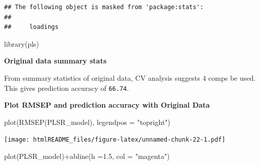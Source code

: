 \documentclass[
]{article}
\newenvironment{Shaded}{\begin{snugshade}}{\end{snugshade}}
\newcommand{\AttributeTok}[1]{\textcolor[rgb]{0.77,0.63,0.00}{#1}}
\newcommand{\CommentTok}[1]{\textcolor[rgb]{0.56,0.35,0.01}{\textit{#1}}}
\newcommand{\ConstantTok}[1]{\textcolor[rgb]{0.00,0.00,0.00}{#1}}
\newcommand{\FloatTok}[1]{\textcolor[rgb]{0.00,0.00,0.81}{#1}}
\newcommand{\FunctionTok}[1]{\textcolor[rgb]{0.00,0.00,0.00}{#1}}
\newcommand{\NormalTok}[1]{#1}
\newcommand{\OtherTok}[1]{\textcolor[rgb]{0.56,0.35,0.01}{#1}}
\newcommand{\SpecialCharTok}[1]{\textcolor[rgb]{0.00,0.00,0.00}{#1}}
\newcommand{\StringTok}[1]{\textcolor[rgb]{0.31,0.60,0.02}{#1}}
\begin{document}
\begin{verbatim}
## The following object is masked from 'package:stats':
## 
##     loadings
\end{verbatim}

\begin{Shaded}
\begin{Highlighting}[]
\FunctionTok{library}\NormalTok{(pls)}
\end{Highlighting}
\end{Shaded}

\textbf{Original data summary stats}

From summary statistics of original data, CV analysis suggests 4 comps
be used. This gives prediction accuracy of \texttt{66.74}.

\begin{Shaded}
\end{Shaded}

\textbf{Plot RMSEP and prediction accuracy with Original Data}

\begin{Shaded}
\begin{Highlighting}[]
\FunctionTok{plot}\NormalTok{(}\FunctionTok{RMSEP}\NormalTok{(PLSR\_model), }\AttributeTok{legendpos =} \StringTok{"topright"}\NormalTok{)}
\end{Highlighting}
\end{Shaded}

\texttt{[image: htmlREADME\_files/figure-latex/unnamed-chunk-22-1.pdf]}

\begin{Shaded}
\begin{Highlighting}[]
\FunctionTok{plot}\NormalTok{(PLSR\_model)}\SpecialCharTok{+}\FunctionTok{abline}\NormalTok{(}\AttributeTok{h =}\FloatTok{1.5}\NormalTok{, }\AttributeTok{col =} \StringTok{"magenta"}\NormalTok{)}
\end{Highlighting}
\end{Shaded}
\end{document}
